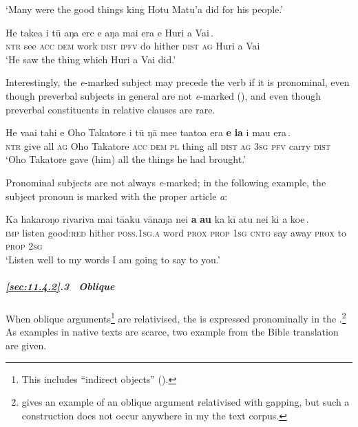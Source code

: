 \glt 
‘Many were the good things king Hotu Matu’a did for his people.’ \textstyleExampleref{[R369.024]} 
\z

\ea\label{ex:11.92}
\gll He take{\ꞌ}a i tū aŋa erc {\ob}e aŋa mai era e Huri {\ꞌ}a Vai\,{\cb}. \\
\textsc{ntr} see \textsc{acc} \textsc{dem} work \textsc{dist} {\db}\textsc{ipfv} do hither \textsc{dist} \textsc{ag} Huri a Vai \\

\glt
‘He saw the thing which Huri a Vai did.’ \textstyleExampleref{[R304.004]} 
\z

Interestingly, the \textit{e}{}-marked subject may precede the verb if it is pronominal, even though preverbal subjects in general are not \textit{e}{}-marked (), and even though preverbal constituents in relative clauses are rare.

\ea\label{ex:11.93}
\gll He va{\ꞌ}ai tahi e {\ꞌ}Oho Takatore i tū ŋā me{\ꞌ}e ta{\ꞌ}ato{\ꞌ}a era   {\ob}\textbf{e} \textbf{ia} i ma{\ꞌ}u era\,{\cb}.\\
\textsc{ntr} give all \textsc{ag} Oho Takatore \textsc{acc} \textsc{dem} \textsc{pl} thing all \textsc{dist}  {\db}\textsc{ag} \textsc{3sg} \textsc{pfv} carry \textsc{dist}\\

\glt
‘Oho Takatore gave (him) all the things he had brought.’ \textstyleExampleref{[R304.115]} 
\z

Pronominal subjects are not always \textit{e}{}-marked; in the following example, the subject pronoun is marked with the proper article \textit{a}:

\ea\label{ex:11.94}
\gll Ka hakaroŋo rivariva mai tā{\ꞌ}aku vānaŋa nei {\ob}\textbf{a} \textbf{au}  ka kī atu nei ki a koe\,{\cb}.\\
\textsc{imp} listen good:\textsc{red} hither \textsc{poss.1sg.a} word \textsc{prox} {\db}\textsc{prop} \textsc{1sg}  \textsc{cntg} say away \textsc{prox} to \textsc{prop} \textsc{2sg}\\

\glt 
‘Listen well to my words I am going to say to you.’ \textstyleExampleref{[R229.243]} 
\z

\subparagraph{\ref{sec:11.4.2}.3~ Oblique} When oblique arguments\footnote{\label{fn:511}This includes “indirect objects” ().} are relativised, the  is expressed pronominally in the .\footnote{\label{fn:512}\citet[1]{Silva-Corvalán1978} gives an example of an oblique argument relativised with gapping, but such a construction does not occur anywhere in my the text corpus.} As examples in native texts are scarce, two example from the Bible translation are given.

